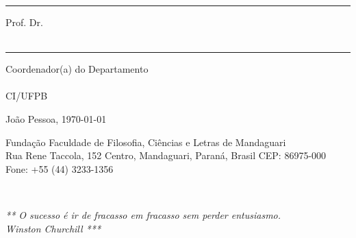 \documentclass{tcc}
\begin{document}
\hrule
\noindent Prof. Dr. \profc\\
\instc\\

\vspace{0.8in}

\hrule
\noindent Coordenador(a) do Departamento \departamento\\
\coordenador\\
CI/UFPB\\

\vfill

\begin{center}
João Pessoa, \today
\end{center}

\vspace{0.05in}

\begin{center}
\footnotesize{ Fundação Faculdade de Filosofia, Ciências e Letras de Mandaguari\\
Rua Rene Taccola, 152  Centro, Mandaguari, Paraná, Brasil CEP: 86975-000\\
Fone: +55 (44) 3233-1356}
\end{center}
\afterpage{\blankpage \addtocounter{page}{1}}
\newpage
$ $
\vfill

\begin{flushright}
\em *** O sucesso é ir de fracasso em fracasso sem perder entusiasmo.\\
Winston Churchill ***
\end{flushright}

\afterpage{\blankpage \addtocounter{page}{1}}

\newpage

\section*{} 


\newpage



\newpage


\newpage



\newpage

\renewcommand{\listfigurename}{\centering LISTA DE FIGURAS}
\listoffigures
\newpage

\renewcommand{\listtablename}{\centering LISTA DE TABELAS}
\listoftables
\newpage
\end{document}
